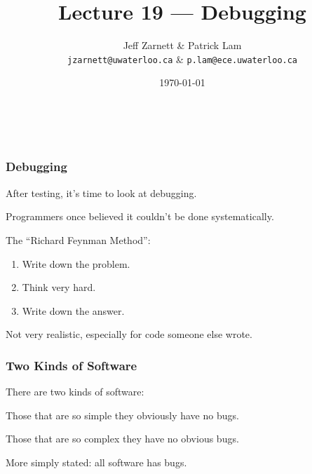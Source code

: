 
\usepackage{alltt}

\title{Lecture 19 --- Debugging}

\author{Jeff Zarnett \& Patrick Lam \\ \small \texttt{jzarnett@uwaterloo.ca} \& \texttt{p.lam@ece.uwaterloo.ca}}
\date{\today}



\begin{frame}
  \titlepage

  \vfill
  \begin{center}
    \\
                  {\tiny\CcNote{\CcLongnameByNcSa}}
                  \vspace*{-2.5ex}
  \end{center}

\end{frame}

\begin{frame}
\frametitle{Debugging}
\begin{changemargin}{1cm}
After testing, it's time to look at debugging. 

Programmers once believed it couldn't be done systematically.

The ``Richard Feynman Method'':
\begin{enumerate}
	\item Write down the problem.
	\item Think very hard.
	\item Write down the answer.
\end{enumerate}

Not very realistic, especially for code someone else wrote.


\end{changemargin}
\end{frame}


\begin{frame}
\frametitle{Two Kinds of Software}
\begin{changemargin}{1cm}
There are two kinds of software:

Those that are so simple they obviously have no bugs.

Those that are so complex they have no obvious bugs.


More simply stated: all software has bugs.

\end{changemargin}
\end{frame}

